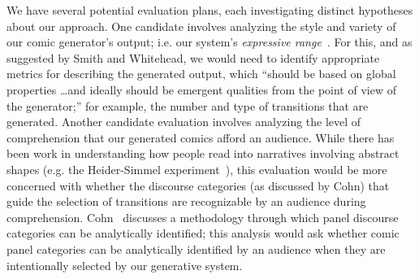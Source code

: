 We
have several potential evaluation plans, each investigating distinct
hypotheses about our approach.
%
One candidate involves analyzing the style and variety of our
comic generator's output; i.e. our system's 
\emph{expressive range}~\cite{smith2010analyzing}. For this, and as
suggested by Smith and Whitehead, we would need to identify
appropriate metrics for describing the generated output, which ``should be
based on global properties \ldots and ideally should be emergent qualities
from the point of view of the generator;'' for example, the number and type
of transitions that are generated.
%
%
Another candidate evaluation involves analyzing the level of comprehension
that our generated comics afford an audience. While there has been work in
understanding how people read into narratives involving abstract
shapes (e.g. the Heider-Simmel experiment~\cite{heider1944experimental}),
this evaluation would be more concerned with whether the discourse
categories (as discussed by Cohn) that guide the selection of transitions
are recognizable by an audience during comprehension.
Cohn~\cite{cohn2015narrative} discusses a methodology through which panel
discourse categories can be analytically identified; this analysis would
ask whether comic panel categories can be analytically identified by an
audience when they are intentionally selected by our generative system.




